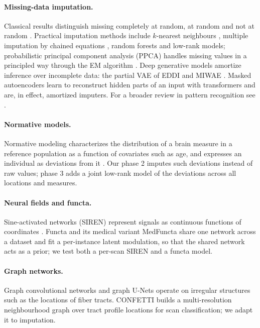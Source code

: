 \documentclass[11pt]{article}
\begin{document}
\paragraph{Missing-data imputation.} Classical results distinguish missing completely at random, at random and not at
random \citep{rubin1976inference,little2019missing}. Practical imputation methods include $k$-nearest neighbours
\citep{troyanskaya2001knn}, multiple imputation by chained equations \citep{vanbuuren2011mice}, random forests
\citep{stekhoven2012missforest} and low-rank models; probabilistic principal component analysis (PPCA) handles missing
values in a principled way through the EM algorithm \citep{tipping1999ppca,ilin2010pca}. Deep generative models
amortize inference over incomplete data: the partial VAE of EDDI \citep{ma2019eddi} and MIWAE
\citep{mattei2019miwae}. Masked autoencoders \citep{he2022mae} learn to reconstruct hidden parts of an input with
transformers \citep{vaswani2017attention} and are, in effect, amortized imputers. For a broader review in pattern
recognition see \citet{garcialaencina2010pattern}.

\paragraph{Normative models.} Normative modeling characterizes the distribution of a brain measure in a reference
population as a function of covariates such as age, and expresses an individual as deviations from it
\citep{marquand2016normative,rutherford2022charting,bethlehem2022brainchart}. Our phase 2 imputes such deviations
instead of raw values; phase 3 adds a joint low-rank model of the deviations across all locations and measures.

\paragraph{Neural fields and functa.} Sine-activated networks (SIREN) represent signals as continuous functions of
coordinates \citep{sitzmann2020siren}. Functa \citep{dupont2022functa} and its medical variant MedFuncta
\citep{friedrich2025medfuncta} share one network across a dataset and fit a per-instance latent modulation, so that the
shared network acts as a prior; we test both a per-scan SIREN and a functa model.

\paragraph{Graph networks.} Graph convolutional networks \citep{kipf2017gcn} and graph U-Nets \citep{gao2019graphunet}
operate on irregular structures such as the locations of fiber tracts. CONFETTI \citep{confetti} builds a
multi-resolution neighbourhood graph over tract profile locations for scan classification; we adapt it to
imputation.
\end{document}
